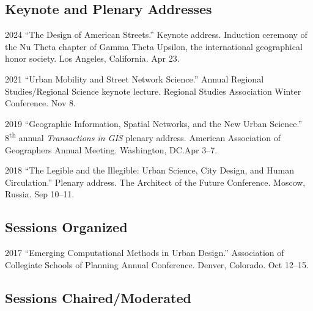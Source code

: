 \documentclass[11pt,letterpaper]{report}
\begin{document}
    \subsection*{Keynote and Plenary Addresses}

    \begin{tablist}

        \item[2024] \tab{}\enquote{The Design of American Streets.} Keynote address. Induction ceremony of the Nu Theta chapter of Gamma Theta Upsilon, the international geographical honor society. Los Angeles, California. Apr 23.

        \item[2021] \tab{}\enquote{Urban Mobility and Street Network Science.} Annual Regional Studies/Regional Science keynote lecture. Regional Studies Association Winter Conference. Nov 8.

        \item[2019] \tab{}\enquote{Geographic Information, Spatial Networks, and the New Urban Science.} 8\textsuperscript{th} annual \textit{Transactions in GIS} plenary address. American Association of Geographers Annual Meeting. Washington, DC.\@ Apr 3--7.

        \item[2018] \tab{}\enquote{The Legible and the Illegible: Urban Science, City Design, and Human Circulation.} Plenary address. The Architect of the Future Conference. Moscow, Russia. Sep 10--11.

    \end{tablist}

    \subsection*{Sessions Organized}

    \begin{tablist}

        \item[2017] \tab{}\enquote{Emerging Computational Methods in Urban Design.} Association of Collegiate Schools of Planning Annual Conference. Denver, Colorado. Oct 12--15.

    \end{tablist}

    \subsection*{Sessions Chaired/Moderated}
\end{document}
